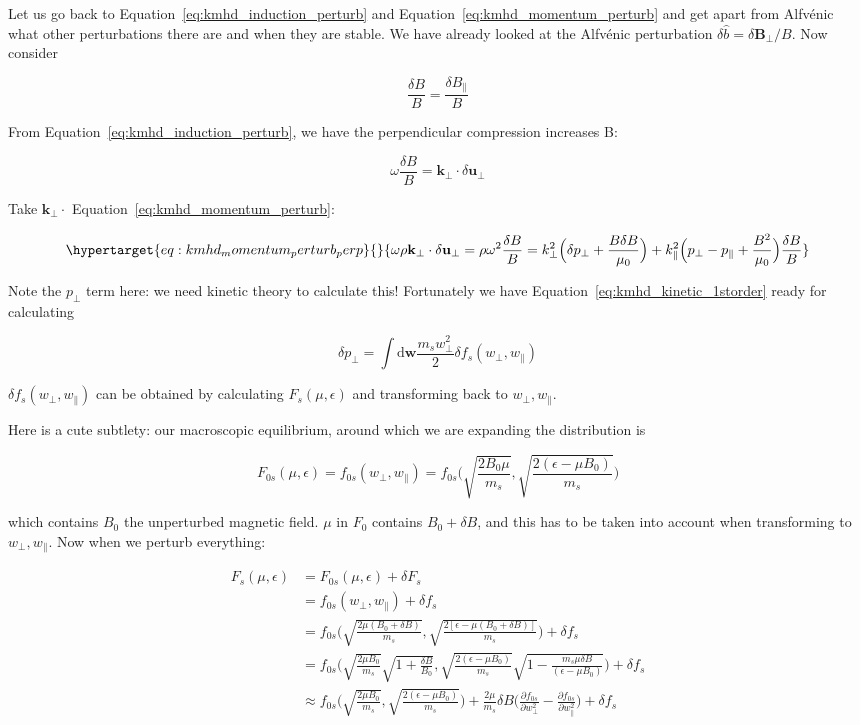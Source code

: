 \documentclass[
  notoc %
]{tufte-book}
\begin{document}
Let us go back to Equation~\ref{eq:kmhd_induction_perturb} and
Equation~\ref{eq:kmhd_momentum_perturb} and get apart from Alfvénic what
other perturbations there are and when they are stable. We have already
looked at the Alfvénic perturbation
\(\delta\hat{b}=\delta \mathbf{B}_\perp/B\). Now consider

\[
\frac{\delta B}{B} = \frac{\delta B_\parallel}{B}
\]

From Equation~\ref{eq:kmhd_induction_perturb}, we have the perpendicular
compression increases B:

\[
\omega\frac{\delta B}{B} = \mathbf{k}_\perp\cdot\delta\mathbf{u}_\perp
\]

Take \(\mathbf{k}_\perp\cdot\) Equation~\ref{eq:kmhd_momentum_perturb}:

\begin{equation}\protect\hypertarget{eq:kmhd_momentum_perturb_perp}{}{
\omega\rho\mathbf{k}_\perp\cdot\delta\mathbf{u}_\perp = \rho\omega^2 \frac{\delta B}{B} = k_\perp^2\Big( \delta p_\perp + \frac{B\delta B}{\mu_0} \Big) + k_\parallel^2\Big( p_\perp - p_\parallel + \frac{B^2}{\mu_0} \Big) \frac{\delta B}{B}
}\label{eq:kmhd_momentum_perturb_perp}\end{equation}

Note the \(p_\perp\) term here: we need kinetic theory to calculate
this! Fortunately we have Equation~\ref{eq:kmhd_kinetic_1storder} ready
for calculating

\[
\delta p_\perp = \int \mathrm{d}\mathbf{w}\frac{m_sw_\perp^2}{2}\delta f_s(w_\perp, w_\parallel)
\]

\(\delta f_s(w_\perp, w_\parallel)\) can be obtained by calculating
\(F_s(\mu,\epsilon)\) and transforming back to \(w_\perp,w_\parallel\).

Here is a cute subtlety: our macroscopic equilibrium, around which we
are expanding the distribution is

\[
F_{0s}(\mu,\epsilon) = f_{0s}(w_\perp,w_\parallel) = f_{0s}\Big( \sqrt{\frac{2B_0\mu}{m_s}},\sqrt{\frac{2(\epsilon-\mu B_0)}{m_s}} \Big)
\]

which contains \(B_0\) the unperturbed magnetic field. \(\mu\) in
\(F_0\) contains \(B_0+\delta B\), and this has to be taken into account
when transforming to \(w_\perp,w_\parallel\). Now when we perturb
everything:

\[
\begin{aligned}
F_s(\mu,\epsilon) &= F_{0s}(\mu,\epsilon) + \delta F_s \\
&= f_{0s}(w_\perp,w_\parallel) + \delta f_s \\
&= f_{0s}\Big( \sqrt{\frac{2\mu(B_0+\delta B)}{m_s}},\sqrt{\frac{2[\epsilon-\mu(B_0+\delta B)]}{m_s}} \Big) + \delta f_s \\
&= f_{0s}\Big( \sqrt{\frac{2\mu B_0}{m_s}}\sqrt{1+\frac{\delta B}{B_0}},\sqrt{\frac{2(\epsilon-\mu B_0)}{m_s}}\sqrt{1-\frac{m_s\mu\delta B}{(\epsilon-\mu B_0)}} \Big) + \delta f_s \\
&\approx f_{0s}\Big( \sqrt{\frac{2\mu B_0}{m_s}},\sqrt{\frac{2(\epsilon-\mu B_0)}{m_s}} \Big) + \frac{2\mu}{m_s}\delta B\Big(\frac{\partial f_{0s}}{\partial w_\perp^2}-\frac{\partial f_{0s}}{\partial w_\parallel^2} \Big) + \delta f_s
\end{aligned}
\]
\end{document}
